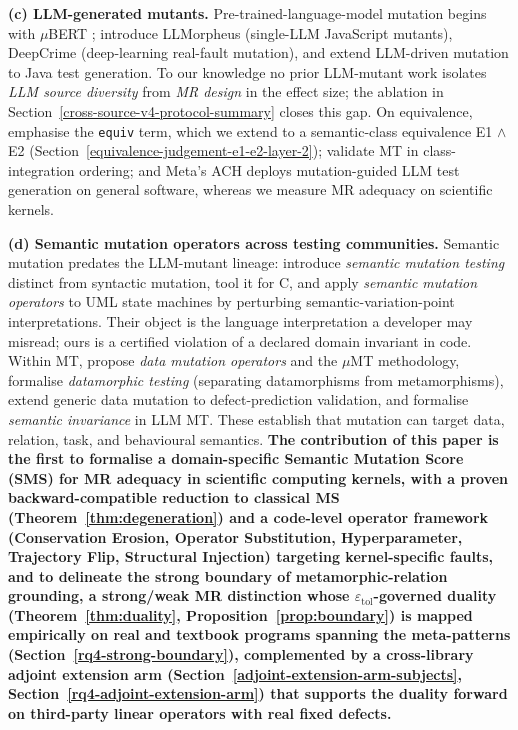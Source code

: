 \documentclass[manuscript,screen,review]{acmart}
\begin{document}
\textbf{(c) LLM-generated mutants.} Pre-trained-language-model mutation begins
with $\mu$BERT \citep{degiovanni2022mubert}; \citet{tip2025llmorpheus} introduce
LLMorpheus (single-LLM JavaScript mutants), \citet{humbatova2021deepcrime}
DeepCrime (deep-learning real-fault mutation), and \citet{dakhel2024llm} extend
LLM-driven mutation to Java test generation. To our knowledge no prior LLM-mutant
work isolates \emph{LLM source diversity} from \emph{MR design} in the effect
size; the ablation in Section~\ref{cross-source-v4-protocol-summary} closes this
gap. On equivalence, \citet{delgadoperez2020equivalent} emphasise the
\texttt{equiv} term, which we extend to a semantic-class equivalence
E1 $\wedge$ E2 (Section~\ref{equivalence-judgement-e1-e2-layer-2});
\citet{zhang2021classintegration} validate MT in class-integration ordering; and
Meta's ACH \citep{foster2025ach} deploys mutation-guided LLM test generation on
general software, whereas we measure MR adequacy on scientific kernels.

\textbf{(d) Semantic mutation operators across testing communities.}
Semantic mutation predates the LLM-mutant lineage: \citet{clark2010semanticmut}
introduce \emph{semantic mutation testing} distinct from syntactic mutation,
\citet{dan2012smtc} tool it for C, and \citet{derezinska2019uml} apply
\emph{semantic mutation operators} to UML state machines by perturbing
semantic-variation-point interpretations. Their object is the language
interpretation a developer may misread; ours is a certified violation of a
declared domain invariant in code. Within MT, \citet{sun2016mumt,sun2024datamutation}
propose \emph{data mutation operators} and the $\mu$MT methodology,
\citet{zhu2020datamorphic} formalise \emph{datamorphic testing} (separating
datamorphisms from metamorphisms), \citet{chan2024metamorphic} extend generic
data mutation to defect-prediction validation, and \citet{curto2025semanticinvariance}
formalise \emph{semantic invariance} in LLM MT. These establish that mutation can
target data, relation, task, and behavioural semantics.
\textbf{The contribution of this paper is the
first to formalise a domain-specific Semantic Mutation Score (SMS) for
MR adequacy in scientific computing kernels, with a proven
backward-compatible reduction to classical MS (Theorem~\ref{thm:degeneration}) and a
code-level operator framework (Conservation Erosion, Operator
Substitution, Hyperparameter, Trajectory Flip, Structural Injection)
targeting kernel-specific faults, and to delineate the strong boundary
of metamorphic-relation grounding, a strong/weak MR distinction whose
$\varepsilon_{\mathrm{tol}}$-governed duality (Theorem~\ref{thm:duality}, Proposition~\ref{prop:boundary})
is mapped empirically on real and textbook programs spanning the
meta-patterns (Section~\ref{rq4-strong-boundary}), complemented by a cross-library adjoint extension
arm (Section~\ref{adjoint-extension-arm-subjects}, Section~\ref{rq4-adjoint-extension-arm}) that supports the duality forward on third-party
linear operators with real fixed defects.}
\end{document}
